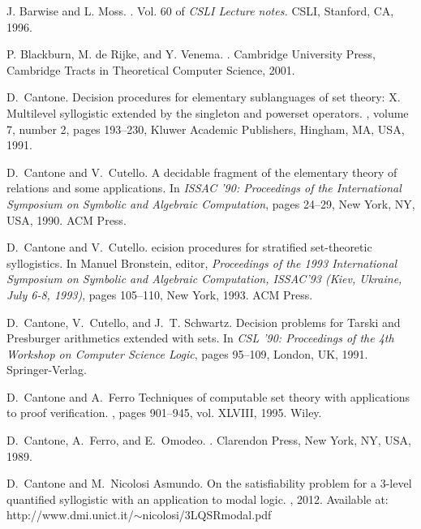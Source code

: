 \documentclass{fundam}
\begin{document}

\begin{thebibliography}{10}

 J. Barwise and L. Moss.
.
\newblock Vol. 60 of {\em CSLI Lecture notes.} CSLI, Stanford, CA, 1996.

P. Blackburn, M. de Rijke, and Y. Venema.
.
\newblock Cambridge University Press, Cambridge Tracts in Theoretical Computer Science, 2001.


D.~Cantone.
\newblock Decision procedures for elementary sublanguages of set theory: X. Multilevel syllogistic extended by the singleton and powerset operators.
, volume 7, number 2, pages 193--230, Kluwer Academic Publishers,
Hingham, MA, USA, 1991.


D.~Cantone and V.~Cutello.
\newblock A decidable fragment of the elementary theory of relations and some
  applications.
\newblock In {\em ISSAC '90: Proceedings of the International Symposium on
  Symbolic and Algebraic Computation}, pages 24--29, New York, NY, USA, 1990.
  ACM Press.

D.~Cantone and V.~Cutello.
ecision procedures for stratified set-theoretic syllogistics.
\newblock In Manuel Bronstein, editor, {\em Proceedings of the 1993
  International Symposium on Symbolic and Algebraic Computation, ISSAC'93
  (Kiev, Ukraine, July 6-8, 1993)}, pages 105--110, New York, 1993. ACM Press.

D.~Cantone, V.~Cutello, and J.~T. Schwartz.  \newblock Decision
problems for Tarski and Presburger arithmetics extended with sets.
\newblock In {\em CSL '90: Proceedings of the 4th Workshop on Computer
Science Logic}, pages 95--109, London, UK, 1991.  Springer-Verlag.

D.~Cantone and A.~Ferro
\newblock Techniques of computable set theory with applications to proof verification.
, pages 901--945, vol. XLVIII, 1995. Wiley.


D.~Cantone, A.~Ferro, and E.~Omodeo.
.
\newblock Clarendon Press, New York, NY, USA, 1989.



D.~Cantone and M.~Nicolosi Asmundo.
\newblock On the satisfiability problem for a 3-level
quantified syllogistic with an application to modal logic.
, 2012.
Available at: http://www.dmi.unict.it/$\sim$nicolosi/3LQSRmodal.pdf


\end{thebibliography}
\end{document}
